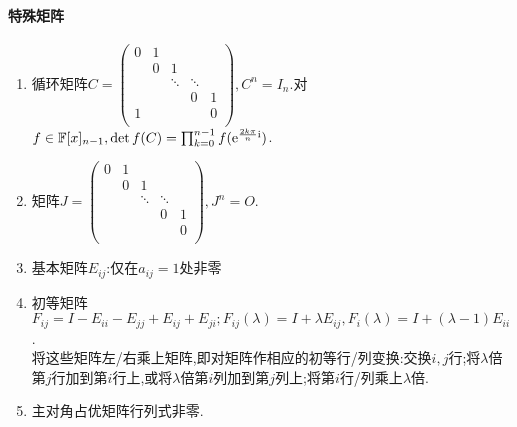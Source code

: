 \documentclass[openany]{book}
\begin{document}
\paragraph{特殊矩阵}
\begin{enumerate}
    \item 循环矩阵$C=\begin{pmatrix}
        0 & 1 &   & &   \\
        & 0 & 1 &   &   \\
        &   & \ddots & \ddots &   \\
        &   &   & 0 & 1 \\
      1 &   &   &   & 0 \\
    \end{pmatrix},C^n=I_n$.对$f\in \mathbb{F}[x]_{n-1}, \det f(C)=\prod_{k=0}^{n-1}f(\mathrm{e}^{\frac{2k\pi}{n}\mathrm{i}})$.
    \item 矩阵$J=\begin{pmatrix}
        0 & 1 &   & &   \\
        & 0 & 1 &   &   \\
        &   & \ddots & \ddots &   \\
        &   &   & 0 & 1 \\
        &   &   &   & 0 \\
    \end{pmatrix},J^n=O$.
    \item 基本矩阵$E_{ij}$:仅在$a_{ij}=1$处非零
    \item 初等矩阵$F_{ij}=I-E_{ii}-E_{jj}+E_{ij}+E_{ji};F_{ij}(\lambda)=I+\lambda E_{ij},F_i(\lambda)=I+(\lambda-1)E_{ii}$.\\
    将这些矩阵左/右乘上矩阵,即对矩阵作相应的初等行/列变换:交换$i,j$行;将$\lambda$倍第$j$行加到第$i$行上,或将$\lambda$倍第$i$列加到第$j$列上;将第$i$行/列乘上$\lambda$倍.
    \item 主对角占优矩阵行列式非零. %
\end{enumerate}
\end{document}
